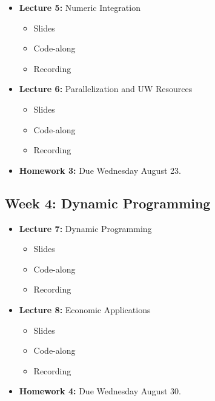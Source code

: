 \documentclass[
]{book}
\providecommand{\tightlist}{%
  \setlength{\itemsep}{0pt}\setlength{\parskip}{0pt}}
\begin{document}
\begin{itemize}
\tightlist
\item
  \textbf{Lecture 5:} Numeric Integration

  \begin{itemize}
  \tightlist
  \item
    Slides
  \item
    Code-along
  \item
    Recording
  \end{itemize}
\item
  \textbf{Lecture 6:} Parallelization and UW Resources

  \begin{itemize}
  \tightlist
  \item
    Slides
  \item
    Code-along
  \item
    Recording
  \end{itemize}
\item
  \textbf{Homework 3:} Due Wednesday August 23.
\end{itemize}

\hypertarget{week-4-dynamic-programming}{%
\subsection{Week 4: Dynamic Programming}\label{week-4-dynamic-programming}}

\begin{itemize}
\tightlist
\item
  \textbf{Lecture 7:} Dynamic Programming

  \begin{itemize}
  \tightlist
  \item
    Slides
  \item
    Code-along
  \item
    Recording
  \end{itemize}
\item
  \textbf{Lecture 8:} Economic Applications

  \begin{itemize}
  \tightlist
  \item
    Slides
  \item
    Code-along
  \item
    Recording
  \end{itemize}
\item
  \textbf{Homework 4:} Due Wednesday August 30.
\end{itemize}
\end{document}
